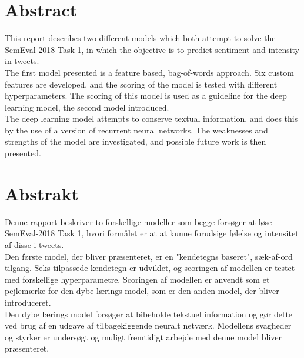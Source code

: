 
\section*{Abstract}
This report describes two different models which both attempt to solve the SemEval-2018 Task 1, in which the objective is to predict sentiment and intensity in tweets.\\
The first model presented is a feature based, bag-of-words approach. Six custom features are developed, and the scoring of the model is tested with different hyperparameters. The scoring of this model is used as a guideline for the deep learning model, the second model introduced.\\
The deep learning model attempts to conserve textual information, and does this by the use of a version of recurrent neural networks. The weaknesses and strengths of the model are investigated, and possible future work is then presented. 

\section*{Abstrakt}
Denne rapport beskriver to forskellige modeller som begge forsøger at løse SemEval-2018 Task 1, hvori formålet er at at kunne forudsige følelse og intensitet af disse i tweets.\\
Den første model, der bliver præsenteret, er en "kendetegns baseret", sæk-af-ord tilgang. Seks tilpassede kendetegn er udviklet, og scoringen af modellen er testet med forskellige hyperparametre. Scoringen af modellen er anvendt som et pejlemærke for den dybe lærings model, som er den anden model, der bliver introduceret.\\
Den dybe lærings model forsøger at bibeholde tekstuel information og gør dette ved brug af en udgave af tilbagekiggende neuralt netværk. Modellens svagheder og styrker er undersøgt og muligt fremtidigt arbejde med denne model bliver præsenteret.